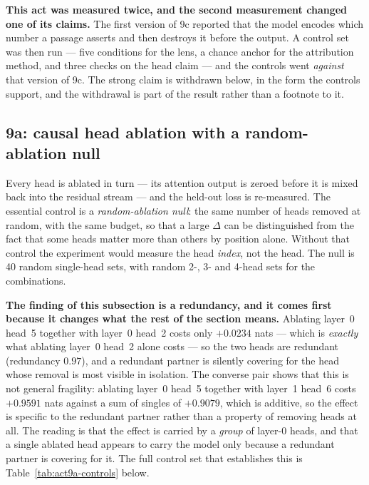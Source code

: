 \documentclass[11pt,a4paper]{article}
\begin{document}
\textbf{This act was measured twice, and the second measurement changed one of
its claims.} The first version of 9c reported that the model encodes which
number a passage asserts and then destroys it before the output. A control set
was then run --- five conditions for the lens, a chance anchor for the
attribution method, and three checks on the head claim --- and the controls
went \emph{against} that version of 9c. The strong claim is withdrawn below,
in the form the controls support, and the withdrawal is part of the result
rather than a footnote to it.

\subsection{9a: causal head ablation with a random-ablation null}
\label{sec:act9a}

Every head is ablated in turn --- its attention output is zeroed before it is
mixed back into the residual stream --- and the held-out loss is re-measured.
The essential control is a \emph{random-ablation null}: the same number of
heads removed at random, with the same budget, so that a large $\Delta$ can be
distinguished from the fact that some heads matter more than others by
position alone. Without that control the experiment would measure the head
\emph{index}, not the head. The null is 40 random single-head sets, with
random 2-, 3- and 4-head sets for the combinations.

\textbf{The finding of this subsection is a redundancy, and it comes first
because it changes what the rest of the section means.} Ablating layer~0
head~5 together with layer~0 head~2 costs only $+0.0234$ nats --- which is
\emph{exactly} what ablating layer~0 head~2 alone costs --- so the two heads
are redundant (redundancy $0.97$), and a redundant partner is silently
covering for the head whose removal is most visible in isolation. The
converse pair shows that this is not general fragility: ablating layer~0
head~5 together with layer~1 head~6 costs $+0.9591$ nats against a sum of
singles of $+0.9079$, which is additive, so the effect is specific to the
redundant partner rather than a property of removing heads at all. The
reading is that the effect is carried by a \emph{group} of layer-0 heads, and
that a single ablated head appears to carry the model only because a
redundant partner is covering for it. The full control set that establishes
this is Table~\ref{tab:act9a-controls} below.
\end{document}
